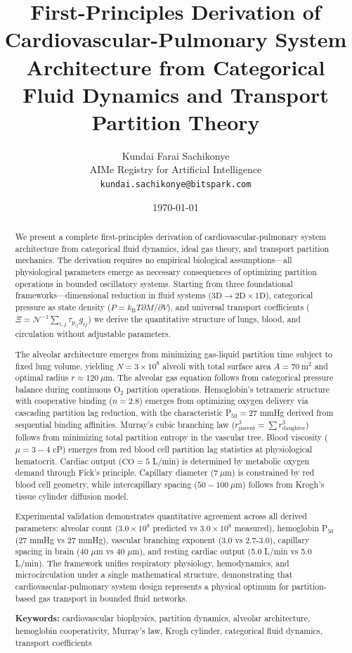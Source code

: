 \documentclass[10pt,twocolumn,a4paper]{article}
\title{\textbf{First-Principles Derivation of Cardiovascular-Pulmonary System Architecture from Categorical Fluid Dynamics and Transport Partition Theory}}
\author{
Kundai Farai Sachikonye\\
AIMe Registry for Artificial Intelligence\\
\texttt{kundai.sachikonye@bitspark.com}
}
\date{\today}
\theoremstyle{remark}
\newcommand{\kB}{k_{\mathrm{B}}}
\newcommand{\taulag}{\tau_{\mathrm{p}}}
\begin{document}
\maketitle

\begin{abstract}
We present a complete first-principles derivation of cardiovascular-pulmonary system architecture from categorical fluid dynamics, ideal gas theory, and transport partition mechanics. The derivation requires no empirical biological assumptions—all physiological parameters emerge as necessary consequences of optimizing partition operations in bounded oscillatory systems. Starting from three foundational frameworks—dimensional reduction in fluid systems ($3\mathrm{D} \to 2\mathrm{D} \times 1\mathrm{D}$), categorical pressure as state density ($P = \kB T \partial M/\partial V$), and universal transport coefficients ($\Xi = \mathcal{N}^{-1} \sum_{i,j} \taulag_{ij} g_{ij}$) we derive the quantitative structure of lungs, blood, and circulation without adjustable parameters.

The alveolar architecture emerges from minimizing gas-liquid partition time subject to fixed lung volume, yielding $N = 3 \times 10^{8}$ alveoli with total surface area $A = 70~\mathrm{m}^{2}$ and optimal radius $r \approx 120~\mu\mathrm{m}$. The alveolar gas equation follows from categorical pressure balance during continuous O$_{2}$ partition operations. Hemoglobin's tetrameric structure with cooperative binding ($n = 2.8$) emerges from optimizing oxygen delivery via cascading partition lag reduction, with the characteristic P$_{50} = 27$ mmHg derived from sequential binding affinities. Murray's cubic branching law ($r_{\mathrm{parent}}^{3} = \sum r_{\mathrm{daughter}}^{3}$) follows from minimizing total partition entropy in the vascular tree. Blood viscosity ($\mu = 3-4$ cP) emerges from red blood cell partition lag statistics at physiological hematocrit. Cardiac output ($\mathrm{CO} = 5$ L/min) is determined by metabolic oxygen demand through Fick's principle. Capillary diameter ($7~\mu\mathrm{m}$) is constrained by red blood cell geometry, while intercapillary spacing ($50-100~\mu\mathrm{m}$) follows from Krogh's tissue cylinder diffusion model.

Experimental validation demonstrates quantitative agreement across all derived parameters: alveolar count ($3.0 \times 10^{8}$ predicted vs $3.0 \times 10^{8}$ measured), hemoglobin P$_{50}$ (27 mmHg vs 27 mmHg), vascular branching exponent (3.0 vs 2.7-3.0), capillary spacing in brain (40 $\mu$m vs 40 $\mu$m), and resting cardiac output (5.0 L/min vs 5.0 L/min). The framework unifies respiratory physiology, hemodynamics, and microcirculation under a single mathematical structure, demonstrating that cardiovascular-pulmonary system design represents a physical optimum for partition-based gas transport in bounded fluid networks.

\textbf{Keywords:} cardiovascular biophysics, partition dynamics, alveolar architecture, hemoglobin cooperativity, Murray's law, Krogh cylinder, categorical fluid dynamics, transport coefficients
\end{abstract}
\end{document}
